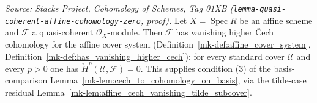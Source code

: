 \begin{lemma}
  \label{mk-lem:affine_cech_vanishing_qcoh}

  \textit{Source: Stacks Project, Cohomology of Schemes, Tag 01XB
  (\texttt{lemma-quasi-coherent-affine-cohomology-zero}, proof).}
  Let \(X = \operatorname{Spec} R\) be an affine scheme and \(\mathcal{F}\) a quasi-coherent
  \(\mathcal{O}_X\)-module. Then \(\mathcal{F}\) has vanishing higher {\v C}ech cohomology for the
  affine cover system (Definition~\ref{mk-def:affine_cover_system},
  Definition~\ref{mk-def:has_vanishing_higher_cech}): for every standard cover \(\mathcal{U}\) and every
  \(p > 0\) one has \(\check{H}^p(\mathcal{U}, \mathcal{F}) = 0\). This supplies condition (3) of the
  basis-comparison Lemma~\ref{mk-lem:cech_to_cohomology_on_basis}, via the tilde-case residual
  Lemma~\ref{mk-lem:affine_cech_vanishing_tilde_subcover}.
\end{lemma}
